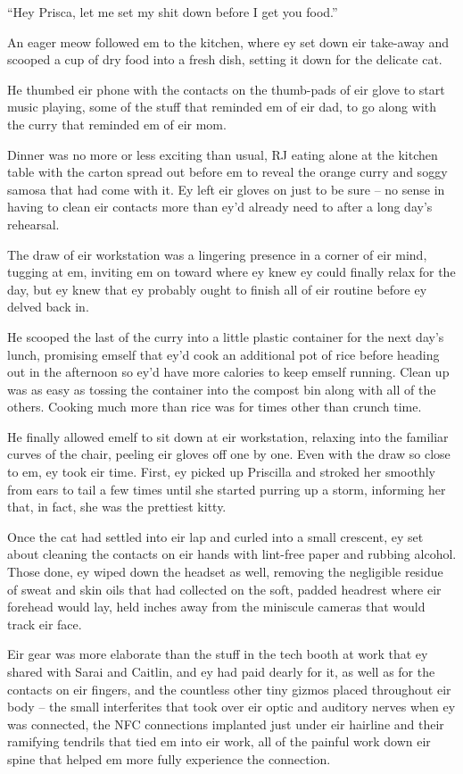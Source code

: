 ``Hey Prisca, let me set my shit down before I get you food.''

An eager meow followed em to the kitchen, where ey set down eir take-away and scooped a cup of dry food into a fresh dish, setting it down for the delicate cat.

He thumbed eir phone with the contacts on the thumb-pads of eir glove to start music playing, some of the stuff that reminded em of eir dad, to go along with the curry that reminded em of eir mom.

Dinner was no more or less exciting than usual, RJ eating alone at the kitchen table with the carton spread out before em to reveal the orange curry and soggy samosa that had come with it.  Ey left eir gloves on just to be sure -- no sense in having to clean eir contacts more than ey'd already need to after a long day's rehearsal.

The draw of eir workstation was a lingering presence in a corner of eir mind, tugging at em, inviting em on toward where ey knew ey could finally relax for the day, but ey knew that ey probably ought to finish all of eir routine before ey delved back in.

He scooped the last of the curry into a little plastic container for the next day's lunch, promising emself that ey'd cook an additional pot of rice before heading out in the afternoon so ey'd have more calories to keep emself running. Clean up was as easy as tossing the container into the compost bin along with all of the others.  Cooking much more than rice was for times other than crunch time.

He finally allowed emelf to sit down at eir workstation, relaxing into the familiar curves of the chair, peeling eir gloves off one by one.  Even with the draw so close to em, ey took eir time.  First, ey picked up Priscilla and stroked her smoothly from ears to tail a few times until she started purring up a storm, informing her that, in fact, she was the prettiest kitty.

Once the cat had settled into eir lap and curled into a small crescent, ey set about cleaning the contacts on eir hands with lint-free paper and rubbing alcohol.  Those done, ey wiped down the headset as well, removing the negligible residue of sweat and skin oils that had collected on the soft, padded headrest where eir forehead would lay, held inches away from the miniscule cameras that would track eir face.

Eir gear was more elaborate than the stuff in the tech booth at work that ey shared with Sarai and Caitlin, and ey had paid dearly for it, as well as for the contacts on eir fingers, and the countless other tiny gizmos placed throughout eir body -- the small interferites that took over eir optic and auditory nerves when ey was connected, the NFC connections implanted just under eir hairline and their ramifying tendrils that tied em into eir work, all of the painful work down eir spine that helped em more fully experience the connection.

